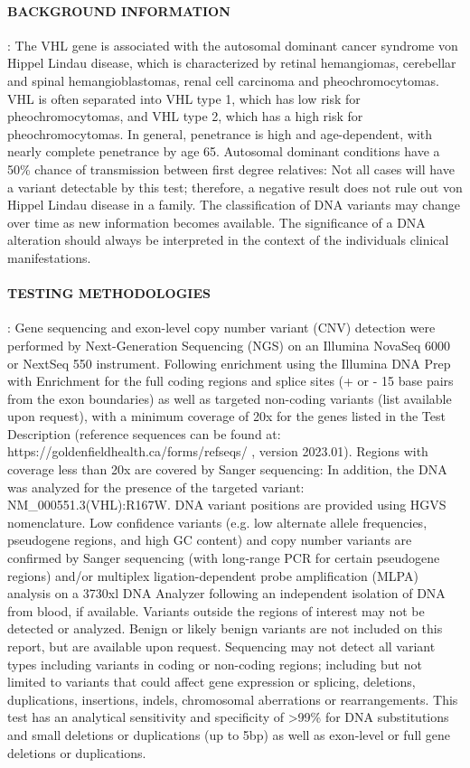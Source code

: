 \documentclass[10pt]{extarticle}
\begin{document}
\hdashrule[0.5ex]{\textwidth}{1pt}{1mm}

\paragraph{BACKGROUND INFORMATION}: The VHL gene is associated with the autosomal dominant cancer syndrome von Hippel Lindau disease, which is characterized by retinal hemangiomas, cerebellar and spinal hemangioblastomas, renal cell carcinoma and pheochromocytomas. VHL is often separated into VHL type 1, which has low risk for pheochromocytomas, and VHL type 2, which has a high risk for pheochromocytomas. In general, penetrance is high and age-dependent, with nearly complete penetrance by age 65. Autosomal dominant conditions have a 50\% chance of transmission between first degree relatives: Not all cases will have a variant detectable by this test; therefore, a negative result does not rule out von Hippel Lindau disease in a family. The classification of DNA variants may change over time as new information becomes available. The significance of a DNA alteration should always be interpreted in the context of the individuals clinical manifestations.

\paragraph{TESTING METHODOLOGIES}: Gene sequencing and exon-level copy number variant (CNV) detection were performed by Next-Generation Sequencing (NGS) on an Illumina NovaSeq 6000 or NextSeq 550 instrument. Following enrichment using the Illumina DNA Prep with Enrichment for the full coding regions and splice sites (+ or - 15 base pairs from the exon boundaries) as well as targeted non-coding variants (list available upon request), with a minimum coverage of 20x for the genes listed in the Test Description (reference sequences can be found at: https://goldenfieldhealth.ca/forms/refseqs/ , version 2023.01). Regions with coverage less than 20x are covered by Sanger sequencing: In addition, the DNA was analyzed for the presence of the targeted variant: NM\_000551.3(VHL):R167W. DNA variant positions are provided using HGVS nomenclature. Low confidence variants (e.g. low alternate allele frequencies, pseudogene regions, and high GC content) and copy number variants are confirmed by Sanger sequencing (with long-range PCR for certain pseudogene regions) and/or multiplex ligation-dependent probe amplification (MLPA) analysis on a 3730xl DNA Analyzer following an independent isolation of DNA from blood, if available. Variants outside the regions of interest may not be detected or analyzed. Benign or likely benign variants are not included on this report, but are available upon request. Sequencing may not detect all variant types including variants in coding or non-coding regions; including but not limited to variants that could affect gene expression or splicing, deletions, duplications, insertions, indels, chromosomal aberrations or rearrangements. This test has an analytical sensitivity and specificity of >99\% for DNA substitutions and small deletions or duplications (up to 5bp) as well as exon-level or full gene deletions or duplications.
\end{document}
